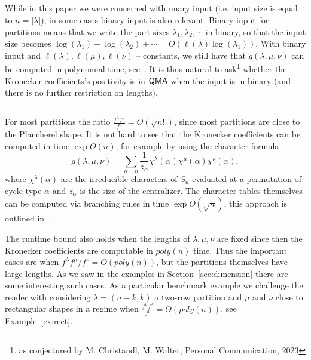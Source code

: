 \documentclass[11pt]{amsart}
\theoremstyle{plain}
\theoremstyle{definition}
\numberwithin{equation}{section}
\newcommand{\la}{\lambda}
\newcommand{\al}{\alpha}
\def\QMA{{\rm{\textsf{QMA}}}}
\newcommand{\poly}{poly}
\def\la{\lambda}
\begin{document}
\subsection{} While in this paper we were concerned with unary input (i.e. input size is equal to $n =|\lambda|$), in some cases binary input is also relevant. Binary input for partitions means that  we write the part sizes $\la_1,\la_2,\cdots$ in binary, so that the input size becomes $\log(\la_1) + \log(\la_2)+\cdots = O(\ell(\la) \log(\la_1) )$. With binary input and $\ell(\la),\ell(\mu),\ell(\nu)$ -- constants, we still have that $g(\la,\mu,\nu)$ can be computed in polynomial time, see~\cite{CDW,PPcomp}. It is thus natural to ask\footnote{as conjectured by M. Christandl, M. Walter, Personal Communication, 2023} whether the Kronecker coefficients's positivity is in $\QMA$ when the input is in binary (and there is no further restriction on lengths). 

\subsection{}\label{sec:rem_kron}
For most partitions the ratio $\frac{f^\la f^\mu}{f^\nu} = O(\sqrt{n!})$, since most partitions are close to the Plancherel shape. It is not hard to see that the Kronecker coefficients can be computed in time $\exp{O(n)}$, for example by using the character formula
$$g(\la,\mu,\nu) = \sum_{\alpha \vdash n} \frac{1}{z_\alpha} \chi^\la(\al) \chi^\mu(\al) \chi^\nu(\al),$$
where $\chi^\la(\al)$ are the irreducible characters of $S_n$ evaluated at a permutation of cycle type $\al$ and $z_\al$ is the size of the centralizer.
The character tables themselves can be computed via branching rules in time $\exp O(\sqrt{n})$, this approach is outlined in~\cite{pak2024signed}. 

The runtime bound also holds when the lengths of $\la,\mu,\nu$ are fixed since then the Kronecker coefficients are computable in $\poly(n)$ time. Thus the important cases are when $f^\la f^\mu /f^\nu = O(\poly(n))$, but the partitions themselves have large lengths. As we  saw in the examples in Section~\ref{sec:dimension} there are some interesting such cases. As a particular benchmark example we challenge the reader with considering $\la =(n-k,k)$ a two-row partition and $\mu$ and $\nu$ close to rectangular shapes in  a regime when $\frac{f^\mu f^\la}{f^\nu} = \Theta (\poly(n))$, see Example~\ref{ex:rect}.
\end{document}
